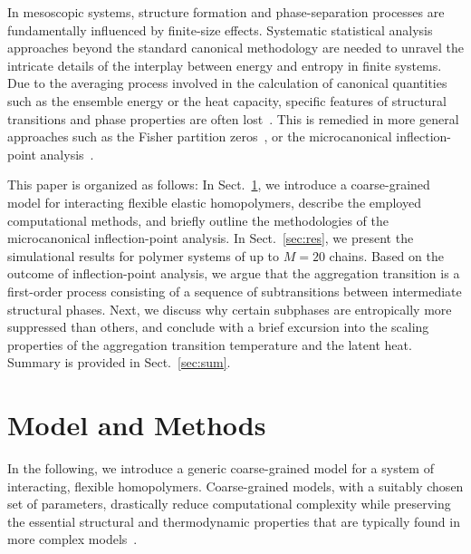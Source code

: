 \documentclass[12pt]{report}
\begin{document}
In mesoscopic systems, structure formation and phase-separation
processes are fundamentally influenced by finite-size effects.
Systematic statistical analysis approaches beyond the standard
canonical methodology are needed to unravel the intricate details
of the interplay between energy and entropy in finite systems.
Due to the averaging process involved in the calculation of 
canonical quantities such as the ensemble energy or the heat capacity,
specific features of structural transitions and phase properties 
are often lost~\cite{Bachmann2014}. This is remedied in more general 
approaches such as the Fisher partition 
zeros~\cite{fisher1,taylor1,rslb1,taylor2}, 
or the microcanonical inflection-point 
analysis~\cite{Schnabel2011,KaiQi2016}.

This paper is organized as follows: In Sect.~\ref{sec:modmeth},
we introduce a coarse-grained model for interacting flexible
elastic homopolymers, describe the employed computational methods, 
and briefly outline the methodologies of the microcanonical 
inflection-point analysis. In Sect.~\ref{sec:res}, we present
the simulational results for polymer systems of up to $M =20$
chains. Based on the outcome of inflection-point analysis,
we argue that the aggregation transition is a first-order process 
consisting of a sequence of subtransitions between intermediate 
structural phases. Next, we discuss why certain subphases
are entropically more suppressed than others, and conclude
with a brief excursion into the scaling properties of the aggregation
transition temperature and the latent heat. Summary is provided
in Sect.~\ref{sec:sum}.
%
\section{Model and Methods}
\label{sec:modmeth}
%
In the following, we introduce a generic coarse-grained model
for a system of interacting, flexible homopolymers. Coarse-grained models,
with a suitably chosen set of
parameters, drastically reduce computational complexity while
preserving the essential structural and thermodynamic properties
that are typically found in more complex
models~\cite{Schmid2011}.
%
\end{document}
